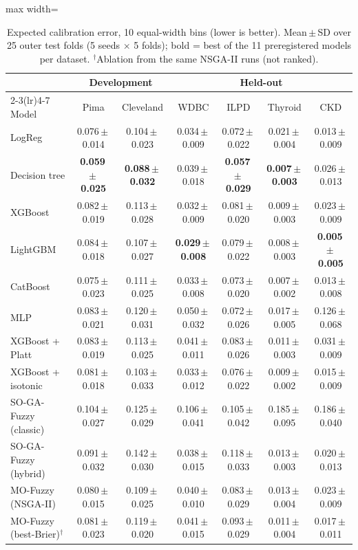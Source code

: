 \begin{table}[t]
\centering
\scriptsize
\setlength{\tabcolsep}{3pt}
\caption{Expected calibration error, 10 equal-width bins (lower is better). Mean\,$\pm$\,SD over 25 outer test folds (5 seeds $\times$ 5 folds); bold = best of the 11 preregistered models per dataset. $^\dagger$Ablation from the same NSGA-II runs (not ranked).}
\label{tab:ece}
\begin{adjustbox}{max width=\linewidth}
\begin{tabular}{lcccccc}
\toprule
 & \multicolumn{2}{c}{Development} & \multicolumn{4}{c}{Held-out} \\
\cmidrule(lr){2-3}\cmidrule(lr){4-7}
Model & Pima & Cleveland & WDBC & ILPD & Thyroid & CKD \\
\midrule
LogReg & 0.076\,$\pm$\,0.014 & 0.104\,$\pm$\,0.023 & 0.034\,$\pm$\,0.009 & 0.072\,$\pm$\,0.022 & 0.021\,$\pm$\,0.004 & 0.013\,$\pm$\,0.009 \\
Decision tree & \textbf{0.059\,$\pm$\,0.025} & \textbf{0.088\,$\pm$\,0.032} & 0.039\,$\pm$\,0.018 & \textbf{0.057\,$\pm$\,0.029} & \textbf{0.007\,$\pm$\,0.003} & 0.026\,$\pm$\,0.013 \\
XGBoost & 0.082\,$\pm$\,0.019 & 0.113\,$\pm$\,0.028 & 0.032\,$\pm$\,0.009 & 0.081\,$\pm$\,0.020 & 0.009\,$\pm$\,0.003 & 0.023\,$\pm$\,0.009 \\
LightGBM & 0.084\,$\pm$\,0.018 & 0.107\,$\pm$\,0.027 & \textbf{0.029\,$\pm$\,0.008} & 0.079\,$\pm$\,0.022 & 0.008\,$\pm$\,0.003 & \textbf{0.005\,$\pm$\,0.005} \\
CatBoost & 0.075\,$\pm$\,0.023 & 0.111\,$\pm$\,0.025 & 0.033\,$\pm$\,0.008 & 0.073\,$\pm$\,0.020 & 0.007\,$\pm$\,0.002 & 0.013\,$\pm$\,0.008 \\
MLP & 0.083\,$\pm$\,0.021 & 0.120\,$\pm$\,0.031 & 0.050\,$\pm$\,0.032 & 0.072\,$\pm$\,0.026 & 0.017\,$\pm$\,0.005 & 0.126\,$\pm$\,0.068 \\
XGBoost + Platt & 0.083\,$\pm$\,0.019 & 0.113\,$\pm$\,0.025 & 0.041\,$\pm$\,0.011 & 0.083\,$\pm$\,0.026 & 0.011\,$\pm$\,0.003 & 0.031\,$\pm$\,0.009 \\
XGBoost + isotonic & 0.081\,$\pm$\,0.018 & 0.103\,$\pm$\,0.033 & 0.033\,$\pm$\,0.012 & 0.076\,$\pm$\,0.022 & 0.009\,$\pm$\,0.002 & 0.015\,$\pm$\,0.009 \\
SO-GA-Fuzzy (classic) & 0.104\,$\pm$\,0.027 & 0.125\,$\pm$\,0.029 & 0.106\,$\pm$\,0.041 & 0.105\,$\pm$\,0.042 & 0.185\,$\pm$\,0.095 & 0.186\,$\pm$\,0.040 \\
SO-GA-Fuzzy (hybrid) & 0.091\,$\pm$\,0.032 & 0.142\,$\pm$\,0.030 & 0.038\,$\pm$\,0.015 & 0.118\,$\pm$\,0.033 & 0.013\,$\pm$\,0.003 & 0.020\,$\pm$\,0.013 \\
MO-Fuzzy (NSGA-II) & 0.080\,$\pm$\,0.015 & 0.109\,$\pm$\,0.025 & 0.040\,$\pm$\,0.010 & 0.083\,$\pm$\,0.029 & 0.013\,$\pm$\,0.004 & 0.023\,$\pm$\,0.009 \\
\midrule
MO-Fuzzy (best-Brier)$^\dagger$ & 0.081\,$\pm$\,0.023 & 0.119\,$\pm$\,0.020 & 0.041\,$\pm$\,0.015 & 0.093\,$\pm$\,0.029 & 0.011\,$\pm$\,0.004 & 0.017\,$\pm$\,0.011 \\
\bottomrule
\end{tabular}
\end{adjustbox}
\end{table}
